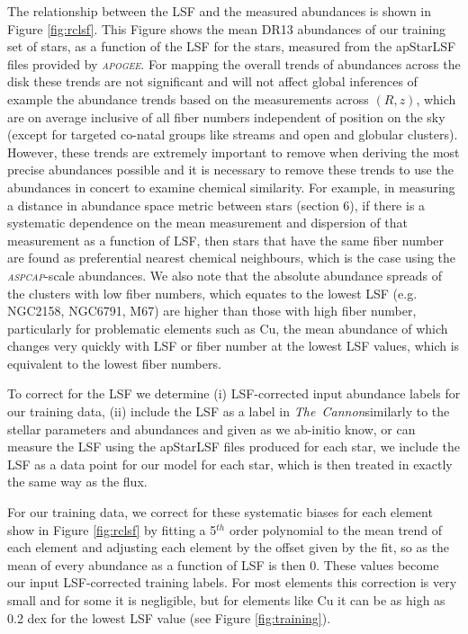 \documentclass[14pt, preprint2]{aastex6}
\newcommand{\project}[1]{\textsl{#1}}
\newcommand{\tc}{\project{The~Cannon}}
\newcommand{\apogee}{\project{\textsc{apogee}}}
\newcommand{\aspcap}{\project{\textsc{aspcap}}}
\begin{document}
The relationship between the LSF and the measured abundances is shown in Figure \ref{fig:rclsf}. This Figure shows the mean DR13 abundances of our training set of stars,  as a function of the LSF for the stars, measured from the apStarLSF files provided by \apogee. For mapping the overall trends of abundances across the disk these trends are not significant and will not affect global inferences of example the abundance trends based on the measurements across $(R,z)$, which are on average inclusive of all fiber numbers independent of position on the sky (except for targeted co-natal groups like streams and open and globular clusters). However, these trends are extremely important to remove when deriving the most precise abundances possible and it is necessary to remove these trends to use the abundances in concert to examine chemical similarity. For example, in measuring a distance in abundance space metric between stars (section 6), if there is a systematic dependence on the mean measurement and dispersion of that measurement as a function of LSF, then stars that have the same fiber number are found as preferential nearest chemical neighbours, which is the case using the \aspcap-scale abundances. We also note that the absolute abundance spreads of the clusters with low fiber numbers, which equates to the lowest LSF (e.g. NGC2158, NGC6791, M67) are higher than those with high fiber number,  particularly for problematic elements such as Cu, the mean abundance of which  changes very quickly with LSF or fiber number at the lowest LSF values, which is equivalent to the lowest fiber numbers. 

To correct for the LSF we determine (i) LSF-corrected input abundance labels for our training data, (ii) include the LSF as a label in \tc similarly to the stellar parameters and abundances and given as we ab-initio know, or can measure the LSF using the apStarLSF files produced for each star, we include the LSF as a data point for our model for each star, which is then treated in exactly the same way as the flux. 

For our training data, we correct for these systematic biases for each element show in Figure \ref{fig:rclsf} by fitting a 5$^{th}$ order polynomial to the mean trend of each element and adjusting each element by the offset given by the fit, so as the mean of every abundance as a function of LSF is then 0. These values become our input LSF-corrected training labels.  For most elements this correction is very small and for some it is negligible, but for elements like Cu it can be as high as 0.2 dex for the lowest LSF value (see Figure \ref{fig:training}). 
\end{document}
